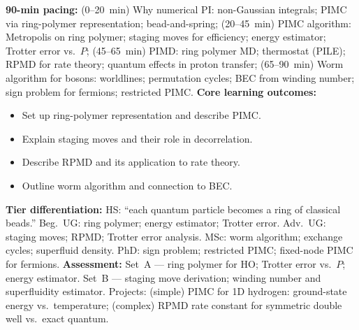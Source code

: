 \documentclass[11pt,a4paper]{article}
\begin{document}
\begin{tcolorbox}[modulebox, title={Module~II.2 / L11: Numerical Path Integrals}]
\textbf{90-min pacing:} (0--20~min) Why numerical PI: non-Gaussian integrals; PIMC via ring-polymer representation; bead-and-spring; (20--45~min) PIMC algorithm: Metropolis on ring polymer; staging moves for efficiency; energy estimator; Trotter error vs.\ $P$; (45--65~min) PIMD: ring polymer MD; thermostat (PILE); RPMD for rate theory; quantum effects in proton transfer; (65--90~min) Worm algorithm for bosons: worldlines; permutation cycles; BEC from winding number; sign problem for fermions; restricted PIMC.
\medskip\textbf{Core learning outcomes:}
\begin{itemize}[leftmargin=1.4em,topsep=2pt,itemsep=1pt]
  \item Set up ring-polymer representation and describe PIMC.
  \item Explain staging moves and their role in decorrelation.
  \item Describe RPMD and its application to rate theory.
  \item Outline worm algorithm and connection to BEC.
\end{itemize}
\medskip\textbf{Tier differentiation:}
HS: ``each quantum particle becomes a ring of classical beads.''
Beg.\ UG: ring polymer; energy estimator; Trotter error.
Adv.\ UG: staging moves; RPMD; Trotter error analysis.
MSc: worm algorithm; exchange cycles; superfluid density.
PhD: sign problem; restricted PIMC; fixed-node PIMC for fermions.
\medskip\textbf{Assessment:}
Set~A --- ring polymer for HO; Trotter error vs.\ $P$; energy estimator.
Set~B --- staging move derivation; winding number and superfluidity estimator.
Projects: (simple) PIMC for 1D hydrogen: ground-state energy vs.\ temperature; (complex) RPMD rate constant for symmetric double well vs.\ exact quantum.
\end{tcolorbox}

\medskip
\end{document}
